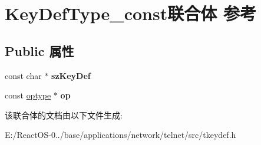 \hypertarget{union_key_def_type__const}{}\section{Key\+Def\+Type\+\_\+const联合体 参考}
\label{union_key_def_type__const}
\subsection*{Public 属性}
\begin{DoxyCompactItemize}
\item 
\mbox{\label{union_key_def_type__const_a884196b2fb742a867067f15cfe84b799}} 
const char $\ast$ {\bfseries sz\+Key\+Def}
\item 
\mbox{\label{union_key_def_type__const_aae007ce501ad2ba6512b1e0088e862cc}} 
const \hyperlink{structoptype}{optype} $\ast$ {\bfseries op}
\end{DoxyCompactItemize}


该联合体的文档由以下文件生成\+:\begin{DoxyCompactItemize}
\item 
E\+:/\+React\+O\+S-\/0../base/applications/network/telnet/src/tkeydef.\+h\end{DoxyCompactItemize}
